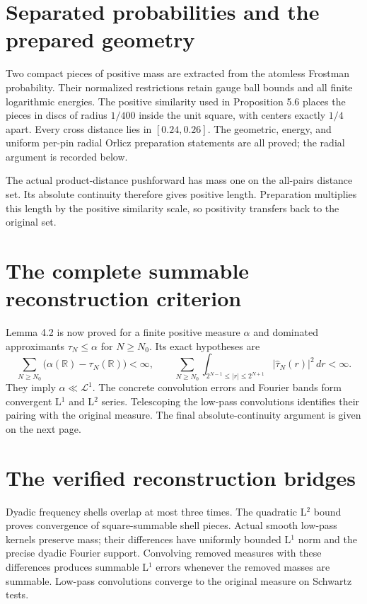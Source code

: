 \documentclass[11pt]{article}
\newcommand{\LL}{\mathcal L}
\begin{document}
\section*{Separated probabilities and the prepared geometry}
Two compact pieces of positive mass are extracted from the atomless Frostman
probability. Their normalized restrictions retain gauge ball bounds and all
finite logarithmic energies. The positive similarity used in Proposition 5.6
places the pieces in discs of radius $1/400$ inside the unit square, with
centers exactly $1/4$ apart. Every cross distance lies in $[0.24,0.26]$.
The geometric, energy, and uniform per-pin radial Orlicz preparation
statements are all proved; the radial argument is recorded below.

The actual product-distance pushforward has mass one on the all-pairs
distance set. Its absolute continuity therefore gives positive length.
Preparation multiplies this length by the positive similarity scale, so
positivity transfers back to the original set.

\section*{The complete summable reconstruction criterion}
Lemma 4.2 is now proved for a finite positive measure $\alpha$ and dominated
approximants $\tau_N\le\alpha$ for $N\ge N_0$. Its exact hypotheses are
\[
\sum_{N\ge N_0}\bigl(\alpha(\mathbb R)-\tau_N(\mathbb R)\bigr)<\infty,
\qquad
\sum_{N\ge N_0}\int_{2^{N-1}\le|r|\le2^{N+1}}
|\widehat\tau_N(r)|^2\,dr<\infty.
\]
They imply $\alpha\ll\LL^1$. The concrete convolution errors and Fourier
bands form convergent L$^1$ and L$^2$ series. Telescoping the low-pass
convolutions identifies their pairing with the original measure. The final
absolute-continuity argument is given on the next page.

\newpage
\section*{The verified reconstruction bridges}
Dyadic frequency shells overlap at most three times. The quadratic L$^2$
bound proves convergence of square-summable shell pieces. Actual smooth
low-pass kernels preserve mass; their differences have uniformly bounded
L$^1$ norm and the precise dyadic Fourier support. Convolving removed
measures with these differences produces summable L$^1$ errors whenever
the removed masses are summable. Low-pass convolutions converge to the
original measure on Schwartz tests.
\end{document}

